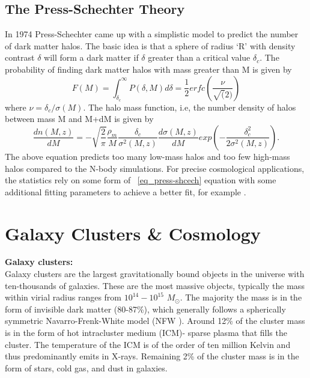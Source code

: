 \subsection{The Press-Schechter Theory}
\label{halo-theory}
In 1974 Press-Schechter came up with a simplistic model to predict the number of dark matter halos. The basic idea is that a sphere of radius `R' with density contrast $\delta$ will form a dark matter if $\delta$ greater than a critical value $\delta_{c}$. The probability of finding dark matter halos with mass greater than M is given by
\begin{equation}
F(M) = \int^{\infty}_{\delta_{c}} P(\delta, M) d\delta = \frac{1}{2} erfc(\frac{\nu}{\sqrt(2)})
\end{equation}
where $\nu = \delta_{c}/ \sigma(M)$. The halo mass function, i.e, the number density of halos between mass M and M+dM is given by 
\begin{equation}
\frac{dn(M,z)}{dM} = -\sqrt{\frac{2}{\pi}} \frac{\rho_{m}}{M} \frac{\delta_{c}}{\sigma^{2}(M,z)} \frac{d\sigma(M,z)}{dM}  exp(-\frac{\delta^{2}_{c}}{2 \sigma^{2}(M,z)}).
\label{eq_press-shcech}
\end{equation}
The above equation predicts too many low-mass halos and too few high-mass halos compared to the N-body simulations. 
For precise cosmological applications, the statistics rely on some form of ~\ref{eq_press-shcech} equation with some additional fitting parameters to achieve a better fit, for example \cite{tinker08, jenkins01}.

\section{Galaxy Clusters \& Cosmology}
\textbf{Galaxy clusters:}\\
Galaxy clusters are the largest gravitationally bound objects in the universe with ten-thousands of galaxies. 
These are the most massive objects, typically the mass within virial radius ranges from $10^{14} - 10^{15}$ $M_{\odot}$. 
The majority the mass is in the form of invisible dark matter (80-87\%), which generally follows a spherically symmetric Navarro-Frenk-White model (NFW \cite{navarro97}). 
Around 12\% of the cluster mass is in the form of hot intracluster medium (ICM)- sparse plasma that fills the cluster. 
The temperature of the ICM is of the order of ten million Kelvin and thus predominantly emits in X-rays. 
Remaining 2\% of the cluster mass is in the form of stars, cold gas, and dust in galaxies.

